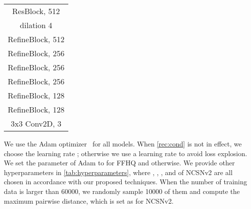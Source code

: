 \documentclass{article}
\begin{document}
\begin{table}[H]
\begin{subtable}[t]{0.3\linewidth}
\begin{tabular}{c}
        \midrule
        ResBlock, 512 \\ dilation 4\\
        \midrule
        RefineBlock, 512\\
        \midrule
        RefineBlock, 256\\
        \midrule
        RefineBlock, 256\\
        \midrule
        RefineBlock, 256\\
        \midrule
        RefineBlock, 128\\
        \midrule
        RefineBlock, 128\\
        \midrule
        3x3 Conv2D, 3\\
        \bottomrule
        \end{tabular}
    \end{subtable}
\end{table}

We use the Adam optimizer~\cite{kingma2014adam} for all models. When \cref{rec:cond} is not in effect, we choose the learning rate ; otherwise we use a learning rate  to avoid loss explosion. We set the  parameter of Adam to  for FFHQ and  otherwise. We provide other hyperparameters in \cref{tab:hyperparameters}, where , , , and  of NCSNv2 are all chosen in accordance with our proposed techniques. When the number of training data is larger than 60000, we randomly sample 10000 of them and compute the maximum pairwise distance, which is set as  for NCSNv2.
\end{document}
